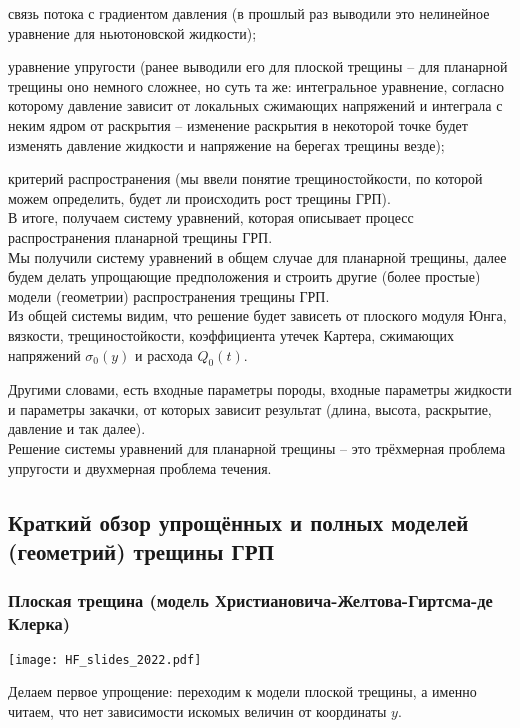 \documentclass[main.tex]{subfiles}
\begin{document}
связь потока с градиентом давления (в прошлый раз выводили это нелинейное уравнение для ньютоновской жидкости);

уравнение упругости (ранее выводили его для плоской трещины -- для планарной трещины оно немного сложнее, но суть та же: интегральное уравнение, согласно которому давление зависит от локальных сжимающих напряжений и интеграла с неким ядром от раскрытия -- изменение раскрытия в некоторой точке будет изменять давление жидкости и напряжение на берегах трещины везде);

критерий распространения (мы ввели понятие трещиностойкости, по которой можем определить, будет ли происходить рост трещины ГРП).
\\

В итоге, получаем систему уравнений, которая описывает процесс распространения планарной трещины ГРП.
\\

Мы получили систему уравнений в общем случае для планарной трещины, далее будем делать упрощающие предположения и строить другие (более простые) модели (геометрии) распространения трещины ГРП.
\\

Из общей системы видим, что решение будет зависеть от плоского модуля Юнга, вязкости, трещиностойкости, коэффициента утечек Картера, сжимающих напряжений $\sigma_0(y)$ и расхода $Q_0(t)$.

Другими словами, есть входные параметры породы, входные параметры жидкости и параметры закачки, от которых зависит результат (длина, высота, раскрытие, давление и так далее).
\\

Решение системы уравнений для планарной трещины -- это трёхмерная проблема упругости и двухмерная проблема течения.

\subsection{Краткий обзор упрощённых и полных моделей (геометрий) трещины ГРП}

\subsubsection{Плоская трещина (модель Христиановича-Желтова-Гиртсма-де Клерка)}

\texttt{[image: HF\_slides\_2022.pdf]}

Делаем первое упрощение: переходим к модели плоской трещины, а именно читаем, что нет зависимости искомых величин от координаты $y$.
\end{document}
